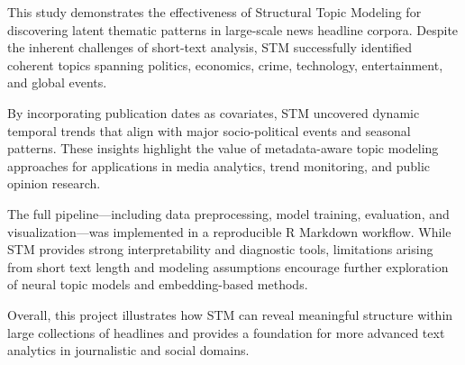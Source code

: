 \documentclass[11pt]{article}
\begin{document}
This study demonstrates the effectiveness of Structural Topic Modeling for discovering latent thematic patterns in large-scale news headline corpora. Despite the inherent challenges of short-text analysis, STM successfully identified coherent topics spanning politics, economics, crime, technology, entertainment, and global events.

By incorporating publication dates as covariates, STM uncovered dynamic temporal trends that align with major socio-political events and seasonal patterns. These insights highlight the value of metadata-aware topic modeling approaches for applications in media analytics, trend monitoring, and public opinion research.

The full pipeline---including data preprocessing, model training, evaluation, and visualization---was implemented in a reproducible R Markdown workflow. While STM provides strong interpretability and diagnostic tools, limitations arising from short text length and modeling assumptions encourage further exploration of neural topic models and embedding-based methods.

Overall, this project illustrates how STM can reveal meaningful structure within large collections of headlines and provides a foundation for more advanced text analytics in journalistic and social domains.
\end{document}
